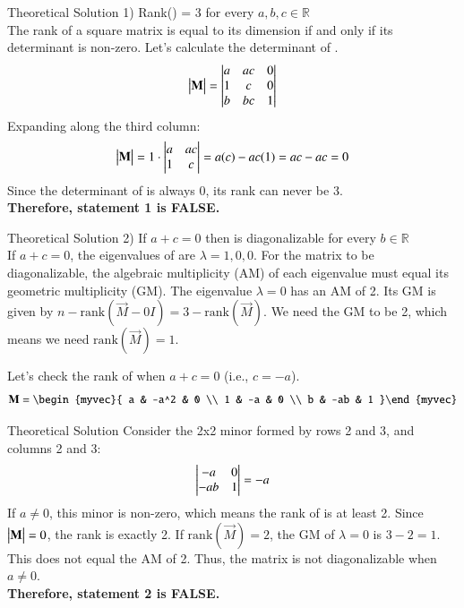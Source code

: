 \documentclass{beamer}
\begin{document}
\begin{frame}{Theoretical Solution}
1) Rank() = 3 for every $a,b,c \in \mathbb{R}$\\
The rank of a square matrix is equal to its dimension if and only if its determinant is non-zero. Let's calculate the determinant of .
\begin{align} 
\mydet{\vec{M}} =  \begin{mydet}{ a & ac & 0 \\ 1 & c & 0 \\ b & bc & 1 }\end{mydet}
\end{align}
Expanding along the third column:
\begin{align}
    \begin{vmatrix}\mathbf{M}\end{vmatrix} = 1 \cdot \begin{vmatrix} a & ac \\ 1 & c \end{vmatrix} = a(c) - ac(1) = ac - ac = 0
\end{align}  
Since the determinant of  is always 0, its rank can never be 3. \\
\textbf{Therefore, statement 1 is FALSE.}

\end{frame}

\begin{frame}{Theoretical Solution}
2) If $a + c = 0$ then  is diagonalizable for every $b \in \mathbb{R}$\\
If $a+c=0$, the eigenvalues of  are $\lambda = 1, 0, 0$.
For the matrix to be diagonalizable, the algebraic multiplicity (AM) of each eigenvalue must equal its geometric multiplicity (GM). The eigenvalue $\lambda=0$ has an AM of 2. Its GM is given by $n - \text{rank}(\vec{M} - 0I) = 3 - \text{rank}(\vec{M})$. We need the GM to be 2, which means we need $\text{rank}(\vec{M})=1$.

Let's check the rank of  when $a+c=0$ (i.e., $c=-a$).
\begin{align} 
\vec{M} = \begin{myvec}{ a & -a^2 & 0 \\ 1 & -a & 0 \\ b & -ab & 1 }\end{myvec} 
\end{align}
\end{frame}

\begin{frame}{Theoretical Solution}
Consider the 2x2 minor formed by rows 2 and 3, and columns 2 and 3:
\begin{align} 
\begin{mydet} {-a & 0 \\ -ab & 1 }\end{mydet} = -a 
\end{align}
If $a \neq 0$, this minor is non-zero, which means the rank of  is at least 2. Since $\begin{vmatrix}\mathbf{M}\end{vmatrix}=0$, the rank is exactly 2. If $\text{rank}(\vec{M})=2$, the GM of $\lambda=0$ is $3-2=1$. This does not equal the AM of 2. Thus, the matrix is not diagonalizable when $a \neq 0$. \\
\textbf{Therefore, statement 2 is FALSE.}
\end{frame}
\end{document}
